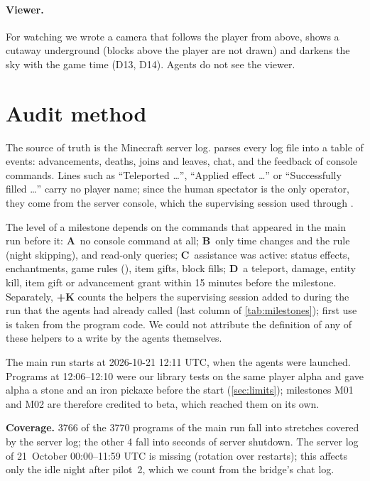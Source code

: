 \documentclass[11pt]{article}
\begin{document}
\paragraph{Viewer.} For watching we wrote a camera that follows the player from above, shows a cutaway underground (blocks above the player are not drawn) and darkens the sky with the game time (D13, D14). Agents do not see the viewer.

\section{Audit method}\label{sec:method}
The source of truth is the Minecraft server log.  parses every log file into a table of events: advancements, deaths, joins and leaves, chat, and the feedback of console commands. Lines such as ``Teleported \dots'', ``Applied effect \dots'' or ``Successfully filled \dots'' carry no player name; since the human spectator is the only operator, they come from the server console, which the supervising session used through .

The level of a milestone depends on the commands that appeared in the main run before it:
\textcolor{lvA}{\textbf{A}}~no console command at all;
\textcolor{lvB}{\textbf{B}}~only time changes and the  rule (night skipping), and read-only queries;
\textcolor{lvC}{\textbf{C}}~assistance was active: status effects, enchantments, game rules (), item gifts, block fills;
\textcolor{lvD}{\textbf{D}}~a teleport, damage, entity kill, item gift or advancement grant within 15 minutes before the milestone.
Separately, \textbf{+K} counts the helpers the supervising session added to  during the run that the agents had already called (last column of \cref{tab:milestones}); first use is taken from the program code. We could not attribute the definition of any of these helpers to a write by the agents themselves.

The main run starts at 2026-10-21 12:11 UTC, when the agents were launched. Programs at 12:06--12:10 were our library tests on the same player alpha and gave alpha a stone and an iron pickaxe before the start (\cref{sec:limits}); milestones M01 and M02 are therefore credited to beta, which reached them on its own.

\textbf{Coverage.} 3766 of the 3770 programs of the main run fall into stretches covered by the server log; the other 4 fall into seconds of server shutdown. The server log of 21~October 00:00--11:59 UTC is missing (rotation over restarts); this affects only the idle night after pilot~2, which we count from the bridge's chat log.
\end{document}
